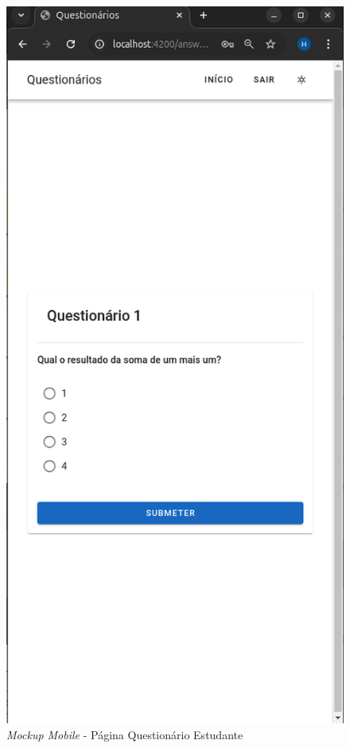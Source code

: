 \documentclass[12pt,a4paper,final]{article}
\begin{document}
    \begin{figure}[H]
        \centering
        \includegraphics[width=\textwidth,height=0.9\textheight,keepaspectratio]{mockups/questionarios.wireframes-estudante-questionario-mobile}
        \caption{\textit{Mockup Mobile} - Página Questionário Estudante}
        \label{fig:mm-pqe}
    \end{figure}
\end{document}
